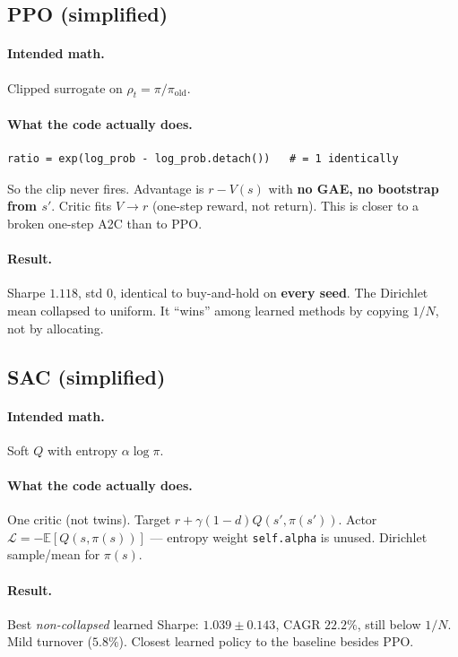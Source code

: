\documentclass[11pt]{article}
\begin{document}
\subsection{PPO (simplified)}

\paragraph{Intended math.}
Clipped surrogate on $\rho_t=\pi/\pi_{\mathrm{old}}$.

\paragraph{What the code actually does.}
\begin{lstlisting}
ratio = exp(log_prob - log_prob.detach())   # = 1 identically
\end{lstlisting}
So the clip never fires. Advantage is $r-V(s)$ with \textbf{no GAE, no bootstrap
from $s'$}. Critic fits $V\to r$ (one-step reward, not return).
This is closer to a broken one-step A2C than to PPO.

\paragraph{Result.}
Sharpe $1.118$, std $0$, identical to buy-and-hold on \textbf{every seed}.
The Dirichlet mean collapsed to uniform.
It ``wins'' among learned methods by copying $1/N$, not by allocating.

\subsection{SAC (simplified)}

\paragraph{Intended math.}
Soft $Q$ with entropy $\alpha\log\pi$.

\paragraph{What the code actually does.}
One critic (not twins). Target $r+\gamma(1-d)Q(s',\pi(s'))$.
Actor $\mathcal{L}=-\mathbb{E}[Q(s,\pi(s))]$ --- entropy weight
\texttt{self.alpha} is unused. Dirichlet sample/mean for $\pi(s)$.

\paragraph{Result.}
Best \emph{non-collapsed} learned Sharpe: $1.039\pm 0.143$, CAGR $22.2\%$,
still below $1/N$. Mild turnover ($5.8\%$).
Closest learned policy to the baseline besides PPO.
\end{document}
